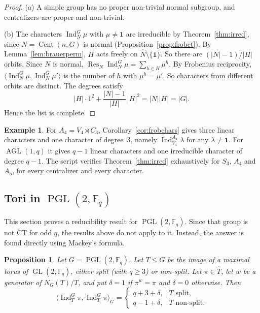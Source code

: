 \documentclass[12pt,letterpaper]{article}
\numberwithin{equation}{section}
\theoremstyle{plain}
\newtheorem{proposition}[theorem]{Proposition}
\theoremstyle{definition}
\newtheorem{example}[theorem]{Example}
\newcommand{\F}{\mathbb{F}}
\DeclareMathOperator{\Cent}{Cent}
\DeclareMathOperator{\Ind}{Ind}
\DeclareMathOperator{\Res}{Res}
\DeclareMathOperator{\GL}{GL}
\DeclareMathOperator{\PGL}{PGL}
\DeclareMathOperator{\AGL}{AGL}
\newcommand{\triv}{\mathbf{1}}
\begin{document}
\begin{proof}
(a) A simple group has no proper non-trivial normal subgroup, and
centralizers are proper and non-trivial.

(b) The characters $\Ind_N^G\mu$ with $\mu\ne\triv$ are irreducible by
Theorem~\ref{thm:irred}, since $N=\Cent(n,G)$ is normal
(Proposition~\ref{prop:frobct}). By Lemma~\ref{lem:brauerperm}, $H$ acts
freely on $\widehat N\setminus\{\triv\}$. So there are $(|N|-1)/|H|$
orbits. Since $N$ is normal, $\Res_N\Ind_N^G\mu=\sum_{h\in H}\mu^h$. By
Frobenius reciprocity, $\langle\Ind_N^G\mu,\Ind_N^G\mu'\rangle$ is the
number of $h$ with $\mu^h=\mu'$. So characters from different orbits are
distinct. The degrees satisfy
\[
|H|\cdot1^2+\frac{|N|-1}{|H|}\,|H|^2=|N||H|=|G|.
\]
Hence the list is complete.
\end{proof}

\begin{example}\label{ex:frobchars}
For $A_4=V_4\rtimes C_3$, Corollary~\ref{cor:frobchars} gives three linear
characters and one character of degree~$3$, namely $\Ind_{V_4}^{A_4}\lambda$
for any $\lambda\ne\triv$. For $\AGL(1,q)$ it gives $q-1$ linear characters
and one irreducible character of degree $q-1$. The script verifies
Theorem~\ref{thm:irred} exhaustively for $S_3$, $A_4$ and $A_5$, for every
centralizer and every character.
\end{example}

\subsection{\texorpdfstring{Tori in $\PGL(2,\F_q)$}{Tori in PGL(2,Fq)}}

This section proves a reducibility result for $\PGL(2,\F_q)$. Since
that group is not CT for odd $q$, the results above do not apply to it.
Instead, the answer is found directly using Mackey's formula.

\begin{proposition}\label{prop:pglnorm}
Let $G=\PGL(2,\F_q)$. Let $T\le G$ be the image of a maximal torus of
$\GL(2,\F_q)$, either split (with $q\ge3$) or non-split. Let $\pi\in
\widehat T$, let $w$ be a generator of $N_G(T)/T$, and put $\delta=1$ if
$\pi^w=\pi$ and $\delta=0$ otherwise. Then
\[
\langle\Ind_T^G\pi,\Ind_T^G\pi\rangle_G=
\begin{cases}
q+3+\delta, & T \text{ split},\\
q-1+\delta, & T \text{ non-split}.
\end{cases}
\]
\end{proposition}
\end{document}
